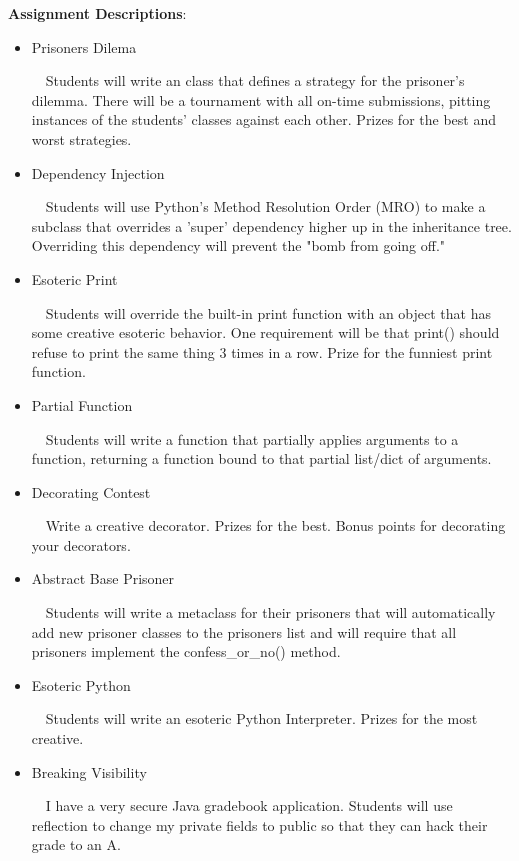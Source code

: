 \documentclass[11pt]{article}
\begin{document}
\textbf {\large Assignment Descriptions}:

\begin{itemize} 

\item Prisoners Dilema 

$\ \ \ $ Students will write an class that defines a strategy for the prisoner's dilemma. There will be a tournament with all on-time submissions, pitting instances of the students' classes against each other. Prizes for the best and worst strategies.

\item Dependency Injection 

$\ \ \ $ Students will use Python's Method Resolution Order (MRO) to make a subclass that overrides a 'super' dependency higher up in the inheritance tree. Overriding this dependency will prevent the "bomb from going off."

\item Esoteric Print 

$\ \ \ $ Students will override the built-in print function with an object that has some creative esoteric behavior. One requirement will be that print() should refuse to print the same thing 3 times in a row. Prize for the funniest print function.

\item Partial Function

$\ \ \ $ Students will write a function that partially applies arguments to a function, returning a function bound to that partial list/dict of arguments.

\item Decorating Contest

$\ \ \ $ Write a creative decorator. Prizes for the best. Bonus points for decorating your decorators.

\item Abstract Base Prisoner

$\ \ \ $ Students will write a metaclass for their prisoners that will automatically add new prisoner classes to the prisoners list and will require that all prisoners implement the confess\_or\_no() method.

\item Esoteric Python 

$\ \ \ $ Students will write an esoteric Python Interpreter. Prizes for the most creative.

\item Breaking Visibility 

$\ \ \ $ I have a very secure Java gradebook application. Students will use reflection to change my private fields to public so that they can hack their grade to an A.


\end{itemize}
\end{document}
